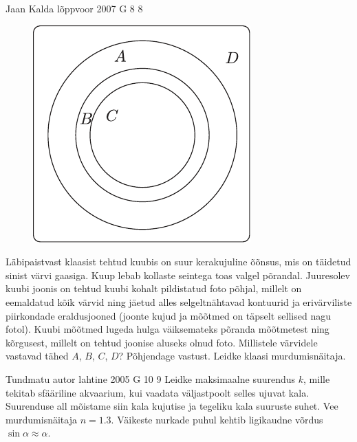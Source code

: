 \documentclass[11pt, twoside]{article}
\begin{document}
{%
{Jaan Kalda} %
{lõppvoor} %
{2007} %
{G 8} %
{8} %
{
\ifStatement
\begin{figure}
	\begin{center}
		\vspace{-20pt}
		\includegraphics[width=0.95\linewidth]{2007-v3g-08-yl}
	\end{center}
\end{figure}
Läbipaistvast klaasist tehtud kuubis on suur kerakujuline õõnsus, mis on täidetud sinist värvi gaasiga. Kuup lebab kollaste seintega toas valgel põrandal. Juuresolev kuubi joonis on tehtud kuubi kohalt pildistatud foto põhjal, millelt on eemaldatud kõik värvid ning jäetud alles selgeltnähtavad kontuurid ja erivärviliste piirkondade eraldusjooned (joonte kujud ja mõõtmed on täpselt sellised nagu fotol). Kuubi mõõtmed lugeda hulga väiksemateks põranda mõõtmetest ning kõrgusest, millelt on tehtud joonise aluseks olnud foto. Millistele värvidele vastavad tähed $A$, $B$, $C$, $D$? Põhjendage vastust. Leidke klaasi murdumisnäitaja.
\fi
}

{Tundmatu autor} %
{lahtine} %
{2005} %
{G 10} %
{9} %
{
\ifStatement
Leidke maksimaalne suurendus $k$, mille tekitab sfääriline akvaarium, kui vaadata väljastpoolt selles ujuvat kala. Suurenduse all mõistame siin kala kujutise ja tegeliku kala suuruste suhet. Vee murdumisnäitaja $n = \num{1,3}$. Väikeste nurkade puhul kehtib ligikaudne võrdus $\sin \alpha \approx \alpha$. 
\fi
}

}
\end{document}
